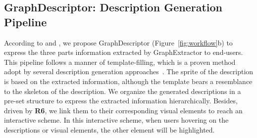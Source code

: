 \subsection{GraphDescriptor: Description Generation Pipeline}
According to \textbf{} and \textbf{}, we propose GraphDescriptor (Figure~\ref{fig:workflow}b) to express the three parts information extracted by GraphExtractor to end-users. This pipeline follows a manner of template-filling, which is a proven method adopt by several description generation approaches~\cite{DBLP:conf/apvis/LiuXHWY20, DBLP:conf/chi/KimHA20}. The sprite of the description is based on the extracted information, although the template bears a resemblance to the skeleton of the description.
We organize the generated descriptions in a pre-set structure to express the extracted information hierarchically. Besides, driven by \textbf{R6}, we link them to their corresponding visual elements to reach an interactive scheme. In this interactive scheme, when users hovering on the descriptions or visual elements, the other element will be highlighted.

